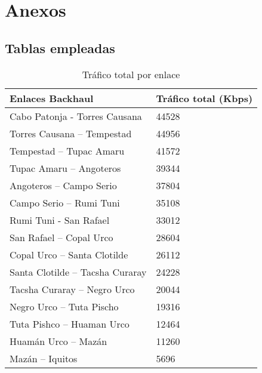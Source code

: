 \chapter{Anexos}
\label{cap:anexo}
\section{Tablas empleadas}

\begin{table}[H]
	\begin{center}
		\begin{tabular}{|l|l|}
			\hline
			Enlaces Backhaul & Tráfico total (Kbps) \\
			\hline 
			Cabo Patonja - Torres Causana & 44528 \\ \hline
			Torres Causana – Tempestad & 44956 \\ \hline
			Tempestad – Tupac Amaru & 41572 \\ \hline
			Tupac Amaru – Angoteros & 39344 \\ \hline
			Angoteros – Campo Serio  & 37804 \\ \hline
			Campo Serio – Rumi Tuni & 35108 \\ \hline
			Rumi Tuni -  San Rafael & 33012 \\ \hline
			San Rafael – Copal Urco & 28604 \\ \hline
			Copal Urco – Santa Clotilde & 26112 \\ \hline
			Santa Clotilde – Tacsha Curaray & 24228 \\ \hline
			Tacsha Curaray – Negro Urco & 20044 \\ \hline
			Negro Urco – Tuta Pischo & 19316 \\ \hline
			Tuta Pishco – Huaman Urco & 12464 \\ \hline
			Huamán Urco – Mazán & 11260 \\ \hline
			Mazán – Iquitos & 5696 \\ \hline
			
		\end{tabular}
	\end{center}
	\caption{Tráfico total por enlace}
	\label{table:RLPUCP}
\end{table}

